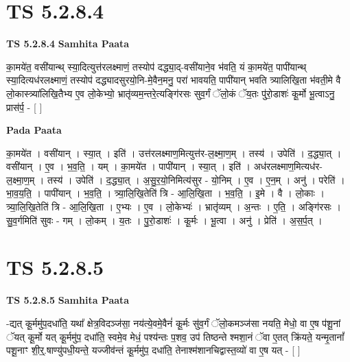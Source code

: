 \documentclass[17pt]{extarticle}
\begin{document}

\section{ TS 5.2.8.4 }

\textbf{TS 5.2.8.4 } \newline
\textbf{Samhita Paata} \newline

का॒मये॑त॒ वसी॑यान्थ् स्या॒दित्युत्त॑रलक्ष्माणं॒ तस्योप॑ दद्ध्या॒द्-वसी॑याने॒व भ॑वति॒ यं का॒मये॑त॒ पापी॑यान्थ् स्या॒दित्यध॑रलक्ष्माणं॒ तस्योप॑ दद्ध्यादसुरयो॒नि-मे॒वैन॒मनु॒ परा॑ भावयति॒ पापी॑यान् भवति त्र्यालिखि॒ता भ॑वती॒मे वै लो॒कास्त्र्या॑लिखि॒तैभ्य ए॒व लो॒केभ्यो॒ भ्रातृ॑व्यम॒न्तरे॒त्यङ्गि॑रसः सुव॒र्गं ॅलो॒कं ॅय॒तः पु॑रो॒डाशः॑ कू॒र्मो भू॒त्वाऽनु॒ प्रास॑र्प॒ - [  ] \newline

\textbf{Pada Paata} \newline

का॒मये॑त । वसी॑यान् । स्या॒त् । इति॑ । उत्त॑रलक्ष्माण॒मित्युत्त॑र-ल॒क्ष्मा॒ण॒म् । तस्य॑ । उपेति॑ । द॒द्ध्या॒त् । वसी॑यान् । ए॒व । भ॒व॒ति॒ । यम् । का॒मये॑त । पापी॑यान् । स्या॒त् । इति॑ । अध॑रलक्ष्माण॒मित्यध॑र- ल॒क्ष्मा॒ण॒म् । तस्य॑ । उपेति॑ । द॒द्ध्या॒त् । अ॒सु॒र॒यो॒निमित्य॑सुर - यो॒निम् । ए॒व । ए॒न॒म् । अनु॑ । परेति॑ । भा॒व॒य॒ति॒ । पापी॑यान् । भ॒व॒ति॒ । त्र्या॒लि॒खि॒तेति॑ त्रि - आ॒लि॒खि॒ता । भ॒व॒ति॒ । इ॒मे । वै । लो॒काः । त्र्या॒लि॒खि॒तेति॑ त्रि - आ॒लि॒खि॒ता । ए॒भ्यः । ए॒व । लो॒केभ्यः॑ । भ्रातृ॑व्यम् । अ॒न्तः । ए॒ति॒ । अङ्गि॑रसः । सु॒व॒र्गमिति॑ सुवः - गम् । लो॒कम् । य॒तः । पु॒रो॒डाशः॑ । कू॒र्मः । भू॒त्वा । अनु॑ । प्रेति॑ । अ॒स॒र्प॒त् ।  \newline





\section{ TS 5.2.8.5 }

\textbf{TS 5.2.8.5 } \newline
\textbf{Samhita Paata} \newline

-द्यत् कू॒र्ममु॑प॒दधा॑ति॒ यथा᳚ क्षेत्र॒विदञ्ज॑सा॒ नय॑त्ये॒वमे॒वैनं॑ कू॒र्मः सु॑व॒र्गं ॅलो॒कमञ्ज॑सा नयति॒ मेधो॒ वा ए॒ष प॑शू॒नां ॅयत् कू॒र्मो यत् कू॒र्ममु॑प॒ दधा॑ति॒ स्वमे॒व मेधं॒ पश्य॑न्तः प॒शव॒ उप॑ तिष्ठन्ते श्मशा॒नं ॅवा ए॒तत् क्रि॑यते॒ यन्मृ॒तानां᳚ पशू॒नाꣳ शी॒र्॒.षाण्यु॑पधी॒यन्ते॒ यज्जीव॑न्तं कू॒र्ममु॑प॒ दधा॑ति॒ तेनाश्म॑शानचिद्वास्त॒व्यो॑ वा ए॒ष यत् - [  ] \newline
\end{document}
